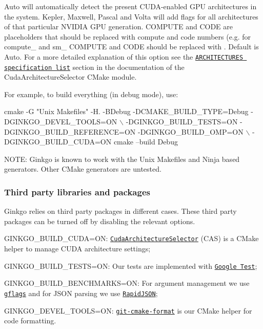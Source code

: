 \begin{DoxyItemize}
{\ttfamily Auto} will automatically detect the present C\+U\+D\+A-\/enabled G\+PU architectures in the system. {\ttfamily Kepler}, {\ttfamily Maxwell}, {\ttfamily Pascal} and {\ttfamily Volta} will add flags for all architectures of that particular N\+V\+I\+D\+IA G\+PU generation. {\ttfamily C\+O\+M\+P\+U\+TE} and {\ttfamily C\+O\+DE} are placeholders that should be replaced with compute and code numbers (e.\+g. for {\ttfamily compute\+\_} and {\ttfamily sm\+\_} {\ttfamily C\+O\+M\+P\+U\+TE} and {\ttfamily C\+O\+DE} should be replaced with {}. Default is {\ttfamily Auto}. For a more detailed explanation of this option see the \href{https://github.com/ginkgo-project/CudaArchitectureSelector/blob/master/CudaArchitectureSelector.cmake#L58}{\tt {\ttfamily A\+R\+C\+H\+I\+T\+E\+C\+T\+U\+R\+ES} specification list} section in the documentation of the Cuda\+Architecture\+Selector C\+Make module.
\end{DoxyItemize}

For example, to build everything (in debug mode), use\+:


\begin{DoxyCode}
cmake  -G "Unix Makefiles" -H. -BDebug -DCMAKE\_BUILD\_TYPE=Debug -DGINKGO\_DEVEL\_TOOLS=ON \(\backslash\)
      -DGINKGO\_BUILD\_TESTS=ON -DGINKGO\_BUILD\_REFERENCE=ON -DGINKGO\_BUILD\_OMP=ON \(\backslash\)
      -DGINKGO\_BUILD\_CUDA=ON 
cmake --build Debug
\end{DoxyCode}


N\+O\+TE\+: Ginkgo is known to work with the {\ttfamily Unix Makefiles} and {\ttfamily Ninja} based generators. Other C\+Make generators are untested.

\subsubsection*{Third party libraries and packages}

Ginkgo relies on third party packages in different cases. These third party packages can be turned off by disabling the relevant options.


\begin{DoxyItemize}
\item G\+I\+N\+K\+G\+O\+\_\+\+B\+U\+I\+L\+D\+\_\+\+C\+U\+DA=ON\+: \href{https://github.com/ginkgo-project/CudaArchitectureSelector}{\tt Cuda\+Architecture\+Selector} (C\+AS) is a C\+Make helper to manage C\+U\+DA architecture settings;
\item G\+I\+N\+K\+G\+O\+\_\+\+B\+U\+I\+L\+D\+\_\+\+T\+E\+S\+TS=ON\+: Our tests are implemented with \href{https://github.com/google/googletest}{\tt Google Test};
\item G\+I\+N\+K\+G\+O\+\_\+\+B\+U\+I\+L\+D\+\_\+\+B\+E\+N\+C\+H\+M\+A\+R\+KS=ON\+: For argument management we use \href{https://github.com/gflags/gflags}{\tt gflags} and for J\+S\+ON parsing we use \href{https://github.com/Tencent/rapidjson}{\tt Rapid\+J\+S\+ON};
\item G\+I\+N\+K\+G\+O\+\_\+\+D\+E\+V\+E\+L\+\_\+\+T\+O\+O\+LS=ON\+: \href{https://github.com/gflegar/git-cmake-format}{\tt git-\/cmake-\/format} is our C\+Make helper for code formatting.
\end{DoxyItemize}

